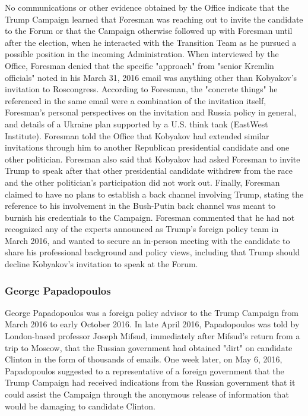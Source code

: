No communications or other evidence obtained by the Office indicate that the Trump Campaign learned that Foresman was reaching out to invite the candidate to the Forum or that the Campaign otherwise followed up with Foresman until after the election, when he interacted with the Transition Team as he pursued a possible position in the incoming Administration.%
When interviewed by the Office, Foresman denied that the specific "approach" from "senior Kremlin officials" noted in his March 31, 2016 email was anything other than Kobyakov's invitation to Roscongress.
According to Foresman, the "concrete things" he referenced in the same email were a combination of the invitation itself, Foresman's personal perspectives on the invitation and Russia policy in general, and details of a Ukraine plan supported by a U.S. think tank (EastWest Institute).
Foresman told the Office that Kobyakov had extended similar invitations through him to another Republican presidential candidate and one other politician.
Foresman also said that Kobyakov had asked Foresman to invite Trump to speak after that other presidential candidate withdrew from the race and the other politician's participation did not work out.%
Finally, Foresman claimed to have no plans to establish a back channel involving Trump, stating the reference to his involvement in the Bush-Putin back channel was meant to burnish his credentials to the Campaign.
Foresman commented that he had not recognized any of the experts announced as Trump's foreign policy team in March 2016, and wanted to secure an in-person meeting with the candidate to share his professional background and policy views, including that Trump should decline Kobyakov's invitation to speak at the Forum.%

\subsubsection{George Papadopoulos}

George Papadopoulos was a foreign policy advisor to the Trump Campaign from March 2016 to early October 2016.%
In late April 2016, Papadopoulos was told by London-based professor Joseph Mifsud, immediately after Mifsud's return from a trip to Moscow, that the Russian government had obtained "dirt" on candidate Clinton in the form of thousands of emails.
One week later, on May 6, 2016, Papadopoulos suggested to a representative of a foreign government that the Trump Campaign had received indications from the Russian government that it could assist the Campaign through the anonymous release of information that would be damaging to candidate Clinton.

